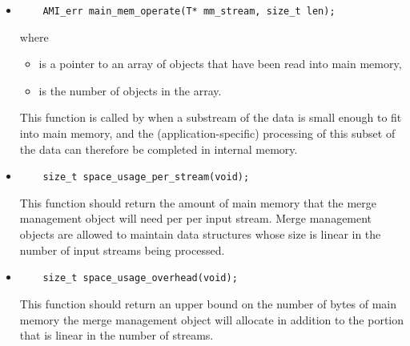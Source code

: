 \begin{itemize}
    \item {}
\begin{verbatim}
    AMI_err main_mem_operate(T* mm_stream, size_t len);
\end{verbatim}
\noindent
where
    \begin{itemize}
        \item {} is a pointer to an array
        of objects that have been read into main memory,
        \item {} is the number of objects in the
        array.
    \end{itemize}
    
    This function is called by
     when a substream of
    the data is small enough to fit into main memory, and
    the (application-specific) processing of this subset of
    the data can therefore be completed in internal memory.

    
    \item {}
\begin{verbatim}
    size_t space_usage_per_stream(void);
\end{verbatim}
    This function should return the amount of main memory
    that the merge management object will need per per input
    stream. Merge management objects are allowed to maintain
    data structures whose size is linear in the number of
    input streams being processed.

    \item {}
\begin{verbatim}
    size_t space_usage_overhead(void);
\end{verbatim}
    This function should return an upper bound on the number
    of bytes of main memory
    the merge management object will allocate in addition to
    the portion that is linear in the number of streams.
    
\end{itemize}




